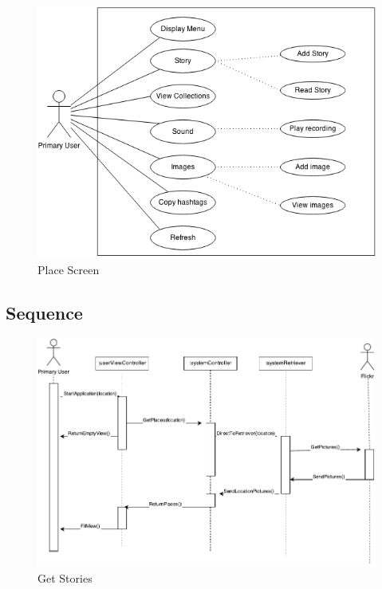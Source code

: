 \begin{figure}[!h]
\begin{center}
\includegraphics[scale=0.6]{ps2.png}
\caption{Place Screen}
\end{center}
\end{figure}

\clearpage

\subsection{Sequence}

\begin{figure}[!h]
\begin{center}
\includegraphics[scale=1]{Get-Stories}
\caption{Get Stories}
\end{center}
\end{figure}

